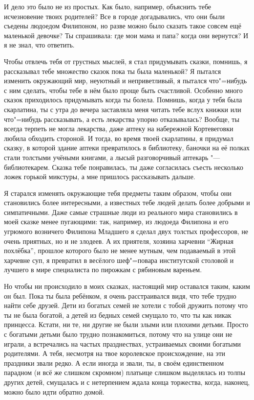 И дело это было не из простых.
Как было, например, объяснить тебе исчезновение твоих родителей?
Все в городе догадывались, что они были съедены людоедом Филипоном, но разве
можно было сказать такое совсем ещё маленькой девочке?
Ты спрашивала: где мои мама и папа?
когда они вернутся?
И я не знал, что ответить.

Чтобы отвлечь тебя от грустных мыслей, я стал придумывать сказки, помнишь, я
рассказывал тебе множество сказок пока ты была маленькой?
Я пытался изменить окружающий мир, неуютный и неприветливый, я пытался
что"=нибудь с ним сделать, чтобы тебе в нём было проще быть счастливой.
Особенно много сказок приходилось придумывать когда ты болела.
Помнишь, когда у тебя была скарлатина, ты с утра до вечера заставляла меня
читать тебе вслух книжки или что"=нибудь рассказывать, а есть лекарства упорно
отказывалась?
Вообще, ты всегда терпеть не могла лекарства, даже аптеку на набережной
Кортевеговки любила обходить стороной.
И тогда, во время твоей скарлатины, я придумал сказку, в которой здание аптеки
превратилось в библиотеку, баночки на её полках стали толстыми учёными книгами,
а лысый разговорчивый аптекарь "--- библиотекарем.
Сказка тебе понравилась, ты даже согласилась съесть несколько ложек горькой
микстуры, а мне пришлось рассказывать дальше.

Я старался изменять окружающие тебя предметы таким образом, чтобы они
становились более интересными, а известных тебе людей делать более добрыми и
симпатичными.
Даже самые страшные люди из реального мира становились в моей сказке менее
пугающими: так, например, из людоеда Филипона и его угрюмого возничего Филипона
Младшего я сделал двух толстых профессоров, не очень приятных, но и не злодеев.
А их приятеля, хозяина харчевни \enquote{Жирная похлёбка}, прошлое которого было
не менее мутным, чем подаваемый в этой харчевне суп, я превратил в весёлого
шеф"=повара институтской столовой и лучшего в мире специалиста по пирожкам с
рябиновым вареньем.

Но чтобы ни происходило в моих сказках, настоящий мир оставался таким, каким он
был.
Пока ты была ребёнком, я очень расстраивался видя, что тебе трудно найти себе
друзей.
Дети из богатых семей не хотели с тобой дружить потому что ты не была богатой, а
детей из бедных семей смущало то, что ты как никак принцесса.
Кстати, ни те, ни другие не были злыми или плохими детьми.
Просто с богатыми детьми было трудно познакомиться, потому что на улице они не
играли, а встречались на частых празднествах, устраиваемых своими богатыми
родителями.
А тебя, несмотря на твое королевское происхождение, на эти праздники звали редко.
А если иногда и звали, ты, в своём единственном парадном (и всё же слишком
скромном) платьице слишком выделялась из толпы других детей, смущалась и с
нетерпением ждала конца торжества, когда, наконец, можно было идти обратно домой.

